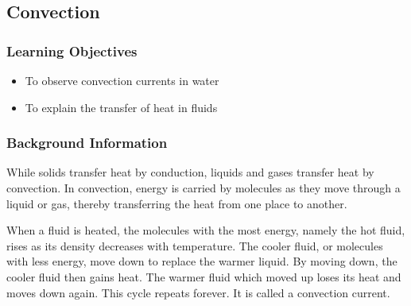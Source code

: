 


\subsection{Convection}

\subsubsection*{Learning Objectives}
\begin{itemize}
\item{To observe convection currents in water}
\item{To explain the transfer of heat in fluids}
\end{itemize}

\subsubsection*{Background Information}
While solids transfer heat by conduction, liquids and gases transfer heat by convection.  In convection, energy is carried by molecules as they move through a liquid or gas, thereby transferring the heat from one place to another.

When a fluid is heated, the molecules with the most energy, namely the hot fluid, rises as its density decreases with temperature.  The cooler fluid, or molecules with less energy, move down to replace the warmer liquid.  By moving down, the cooler fluid then gains heat.  The warmer fluid which moved up loses its heat and moves down again.  This cycle repeats forever.  It is called a convection current.

